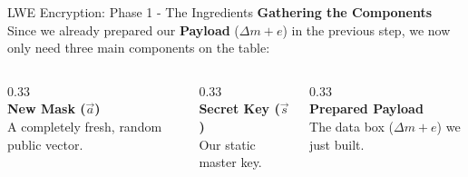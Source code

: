 \documentclass[aspectratio=169, 10pt]{beamer}
\begin{document}
\begin{frame}{LWE Encryption: Phase 1 - The Ingredients}
    \Large \textbf{Gathering the Components} \\
    \vspace{0.2cm}
    \normalsize
    Since we already prepared our \textbf{Payload} ($\Delta m + e$) in the previous step, we now only need three main components on the table:
    \vspace{0.8cm}
    
    \begin{columns}[T]
        \begin{column}{0.33\textwidth}
            \centering
            \textcolor{AccentOrange}{\Huge \faDice} \\ \vspace{0.3cm}
            \textbf{New Mask ($\vec{a}$)} \\
            \vspace{0.1cm}
            \small A completely fresh, random public vector.
        \end{column}
        
        \begin{column}{0.33\textwidth}
            \centering
            \textcolor{DeepBlue}{\Huge \faKey} \\ \vspace{0.3cm}
            \textbf{Secret Key ($\vec{s}$)} \\
            \vspace{0.1cm}
            \small Our static master key.
        \end{column}
        
        \begin{column}{0.33\textwidth}
            \centering
            \textcolor{DeepBlue}{\Huge \faBox} \\ \vspace{0.3cm}
            \textbf{Prepared Payload} \\
            \vspace{0.1cm}
            \small The data box ($\Delta m + e$) we just built.
        \end{column}
    \end{columns}
\end{frame}
\end{document}
